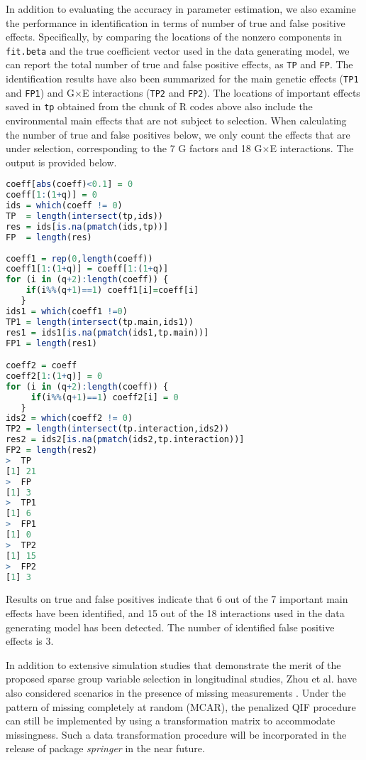 \documentclass[12pt]{article}
\begin{document}
{\color{blue} In addition to evaluating the accuracy in parameter estimation, we also examine the performance in identification in terms of number of true and false positive effects.} Specifically, by comparing the locations of the nonzero components in \texttt{fit.beta} and the true coefficient vector used in the data generating model, we can report the total number of true and false positive effects, as \texttt{TP} and \texttt{FP}. The identification results have also been summarized for the main genetic effects (\texttt{TP1} and \texttt{FP1})  and G$\times$E interactions (\texttt{TP2} and \texttt{FP2}). The locations of important effects saved in \texttt{tp} obtained from the chunk of R codes above also include the environmental main effects that are not subject to selection. When calculating the number of true and false positives below, we only count the effects that are under selection, corresponding to the 7 G factors and 18 G$\times$E interactions. The output is provided below. 

\begin{lstlisting}[language=R]
coeff[abs(coeff)<0.1] = 0
coeff[1:(1+q)] = 0
ids = which(coeff != 0)
TP  = length(intersect(tp,ids))
res = ids[is.na(pmatch(ids,tp))]
FP  = length(res)
 
coeff1 = rep(0,length(coeff))
coeff1[1:(1+q)] = coeff[1:(1+q)]
for (i in (q+2):length(coeff)) {
    if(i%%(q+1)==1) coeff1[i]=coeff[i]
   }
ids1 = which(coeff1 !=0)
TP1 = length(intersect(tp.main,ids1))
res1 = ids1[is.na(pmatch(ids1,tp.main))]
FP1 = length(res1)

coeff2 = coeff
coeff2[1:(1+q)] = 0
for (i in (q+2):length(coeff)) {
     if(i%%(q+1)==1) coeff2[i] = 0
   }
ids2 = which(coeff2 != 0)
TP2 = length(intersect(tp.interaction,ids2))
res2 = ids2[is.na(pmatch(ids2,tp.interaction))]
FP2 = length(res2)
>  TP
[1] 21
>  FP
[1] 3
>  TP1
[1] 6
>  FP1
[1] 0
>  TP2
[1] 15
>  FP2
[1] 3
\end{lstlisting}

Results on true and false positives indicate that 6 out of the 7 important main effects have been identified, and 15 out of the 18 interactions used in the data generating model has been detected. The number of identified false positive effects is 3. 

In addition to extensive simulation studies that demonstrate the merit of the proposed sparse group variable selection in longitudinal studies, Zhou et al. \cite{zhou2022sparse} have also considered scenarios in the presence of missing measurements \cite{rubin1976,little2019l}. Under the pattern of missing completely at random (MCAR), the penalized QIF procedure can still be implemented by using a transformation matrix to accommodate missingness. Such a data transformation procedure will be incorporated in the release of package \emph{springer} in the near future.  
\end{document}
